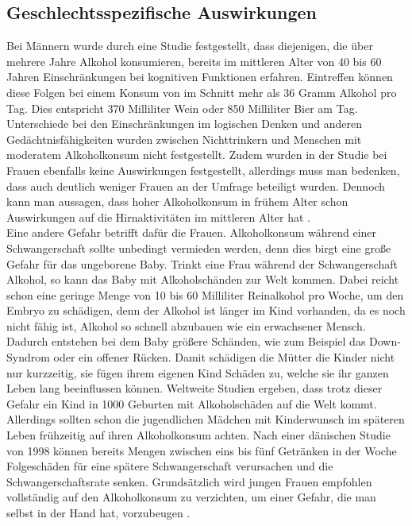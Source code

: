 \documentclass[12pt]{article}
\begin{document}
\subsection{Geschlechtsspezifische Auswirkungen}
Bei Männern wurde durch eine Studie festgestellt, dass diejenigen, die über mehrere Jahre Alkohol konsumieren, bereits im mittleren Alter von 40 bis 60 Jahren Einschränkungen bei kognitiven Funktionen erfahren. Eintreffen können diese Folgen bei einem Konsum von im Schnitt mehr als 36 Gramm Alkohol pro Tag. Dies entspricht 370 Milliliter Wein oder 850 Milliliter Bier am Tag. Unterschiede bei den Einschränkungen im logischen Denken und anderen Gedächtnisfähigkeiten wurden zwischen Nichttrinkern und Menschen mit moderatem Alkoholkonsum  nicht festgestellt. Zudem wurden in der Studie bei Frauen ebenfalls keine Auswirkungen festgestellt, allerdings muss man bedenken, dass auch deutlich weniger Frauen an der Umfrage beteiligt wurden. Dennoch kann man aussagen, dass hoher Alkoholkonsum in frühem Alter schon Auswirkungen auf die Hirnaktivitäten im mittleren Alter hat \autocite{noauthor_alkohol_2014}. \\
Eine andere Gefahr betrifft dafür die Frauen. Alkoholkonsum während einer Schwangerschaft sollte unbedingt vermieden werden, denn dies birgt eine große Gefahr für das ungeborene Baby. Trinkt eine Frau während der Schwangerschaft Alkohol, so kann das Baby mit Alkoholschänden zur Welt kommen. Dabei reicht schon eine geringe Menge von 10 bis 60 Milliliter Reinalkohol pro Woche, um den Embryo zu schädigen, denn der Alkohol ist länger im Kind vorhanden, da es noch nicht fähig ist, Alkohol so schnell abzubauen wie ein erwachsener Mensch. Dadurch entstehen bei dem Baby größere Schänden, wie zum Beispiel das Down-Syndrom oder ein offener Rücken. Damit schädigen die Mütter die Kinder nicht nur kurzzeitig, sie fügen ihrem eigenen Kind Schäden zu, welche sie ihr ganzen Leben lang beeinflussen können. Weltweite Studien ergeben, dass trotz dieser Gefahr ein Kind in 1000 Geburten mit Alkoholschäden auf die Welt kommt. Allerdings sollten schon die jugendlichen Mädchen mit Kinderwunsch im späteren Leben frühzeitig auf ihren Alkoholkonsum achten. Nach einer dänischen Studie von 1998 können bereits Mengen zwischen eins bis fünf Getränken in der Woche Folgeschäden für eine spätere Schwangerschaft verursachen und die Schwangerschaftsrate senken. Grundsätzlich wird jungen Frauen empfohlen vollständig auf den Alkoholkonsum zu verzichten, um einer Gefahr, die man selbst in der Hand hat, vorzubeugen \autocite[7-8]{butzer_alkohol_nodate}.\\ %
\end{document}
